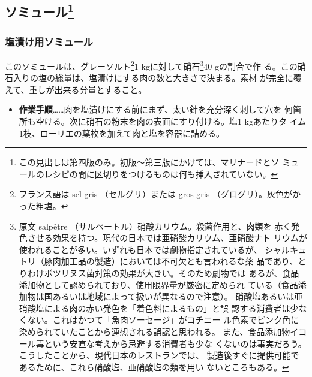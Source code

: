 \hypertarget{saumures}{%
\subsection[ソミュール]{\texorpdfstring{ソミュール\footnote{この見出しは第四版のみ。初版〜第三版にかけては、マリナードとソ
  ミュールのレシピの間に区切りをつけるものは何も挿入されていない。}}{ソミュール}}\label{saumures}}

\vspace*{1\zw}


 
\begin{recette}
\hypertarget{saumure-au-sel}{%
\subsubsection{塩漬け用ソミュール}\label{saumure-au-sel}}



このソミュールは、グレーソルト\footnote{フランス語は sel gris
  （セルグリ）または gros gris （グログリ）。灰色がかった粗塩。}1
kgに対して硝石\footnote{原文 salpêtre
  （サルペートル）硝酸カリウム。殺菌作用と、肉類を
  赤く発色させる効果を持つ。現代の日本では亜硝酸カリウム、亜硝酸ナト
  リウムが使われることが多い。いずれも日本では劇物指定されているが、
  シャルキュトリ（豚肉加工品の製造）においては不可欠とも言われるな薬
  品であり、とりわけボツリヌス菌対策の効果が大きい。そのため劇物では
  あるが、食品添加物として認められており、使用限界量が厳密に定められ
  ている（食品添加物は国あるいは地域によって扱いが異なるので注意）。
  硝酸塩あるいは亜硝酸塩による肉の赤い発色を「着色料によるもの」と誤
  認する消費者は少なくない。これはかつて「魚肉ソーセージ」がコチニー
  ル色素でピンク色に染められていたことから連想される誤認と思われる。
  また、食品添加物イコール毒という安直な考えから忌避する消費者も少な
  くないのは事実だろう。こうしたことから、現代日本のレストランでは、
  製造後すぐに提供可能であるために、これら硝酸塩、亜硝酸塩の類を用い
  ないところもある。}40 gの割合で作
る。この硝石入りの塩の総量は、塩漬けにする肉の数と大きさで決まる。素材
が完全に覆えて、重しが出来る分量とすること。

\begin{itemize}
\tightlist
\item
  \textbf{作業手順}\ldots{}\ldots{}肉を塩漬けにする前にまず、太い針を充分深く刺して穴を
  何箇所も空ける。次に硝石の粉末を肉の表面にすり付ける。塩1 kgあたりタ
  イム1枝、ローリエの葉\undemi{}枚を加えて肉と塩を容器に詰める。
\end{itemize}


\end{recette}
